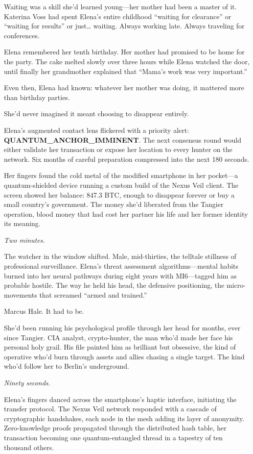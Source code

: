 Waiting was a skill she'd learned young---her mother had been a master of it. Katerina Voss had spent Elena's entire childhood ``waiting for clearance'' or ``waiting for results'' or just\ldots{} waiting. Always working late. Always traveling for conferences.

Elena remembered her tenth birthday. Her mother had promised to be home for the party. The cake melted slowly over three hours while Elena watched the door, until finally her grandmother explained that ``Mama's work was very important.''

Even then, Elena had known: whatever her mother was doing, it mattered more than birthday parties.

She'd never imagined it meant choosing to disappear entirely.

Elena's augmented contact lens flickered with a priority alert: \textbf{QUANTUM\_ANCHOR\_IMMINENT}. The next consensus round would either validate her transaction or expose her location to every hunter on the network. Six months of careful preparation compressed into the next 180 seconds.

Her fingers found the cold metal of the modified smartphone in her pocket---a quantum-shielded device running a custom build of the Nexus Veil client. The screen showed her balance: 847.3 BTC, enough to disappear forever or buy a small country's government. The money she'd liberated from the Tangier operation, blood money that had cost her partner his life and her former identity its meaning.

\emph{Two minutes.}

The watcher in the window shifted. Male, mid-thirties, the telltale stillness of professional surveillance. Elena's threat assessment algorithms---mental habits burned into her neural pathways during eight years with MI6---tagged him as probable hostile. The way he held his head, the defensive positioning, the micro-movements that screamed ``armed and trained.''

Marcus Hale. It had to be.

She'd been running his psychological profile through her head for months, ever since Tangier. CIA analyst, crypto-hunter, the man who'd made her face his personal holy grail. His file painted him as brilliant but obsessive, the kind of operative who'd burn through assets and allies chasing a single target. The kind who'd follow her to Berlin's underground.

\emph{Ninety seconds.}

Elena's fingers danced across the smartphone's haptic interface, initiating the transfer protocol. The Nexus Veil network responded with a cascade of cryptographic handshakes, each node in the mesh adding its layer of anonymity. Zero-knowledge proofs propagated through the distributed hash table, her transaction becoming one quantum-entangled thread in a tapestry of ten thousand others.

